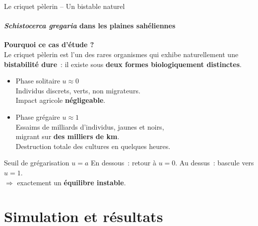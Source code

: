 \documentclass[10pt]{beamer}
\newcommand{\framewithtitle}[1]{%
\begin{frame}[c]{}
  \begin{center}
  \Huge
    \begin{tcolorbox}
      \emph{
        \espace
        \begin{center}
          \textcolor{black}{#1}
        \end{center}
        \espace
      }
    \end{tcolorbox}
  \end{center}
\end{frame}
}
\begin{document}
\begin{frame}{Le criquet pèlerin -- Un bistable naturel}
  \framesubtitle{\textit{Schistocerca gregaria} dans les plaines sahéliennes}

\textbf{Pourquoi ce cas d'étude ?}\\[0.4em]
      Le criquet pèlerin est l'un des rares organismes
      qui exhibe naturellement une \textbf{bistabilité dure}~:
      il existe sous \textbf{deux formes biologiquement distinctes}.

      \medskip
      \begin{itemize}
          \item Phase solitaire \quad $u \approx 0$ \\
        Individus discrets, verts, non migrateurs.\\
        Impact agricole \textbf{négligeable}.
        \item Phase grégaire \quad $u \approx 1$ \\
         Essaims de milliards d'individus, jaunes et noirs,\\
        migrant sur \textbf{des milliers de km}.\\
        Destruction totale des cultures en quelques heures.
      \end{itemize}

      \vspace{0.3em}
      \begin{exampleblock}{Seuil de grégarisation \quad $u = a$}
        En dessous~: retour à $u=0$. Au dessus~: bascule vers $u=1$.\\
        $\Rightarrow$ exactement un \textbf{équilibre instable}.
      \end{exampleblock}
  
\end{frame}

\section{Simulation et résultats}
\framewithtitle{Simulation et résultats}
\end{document}
